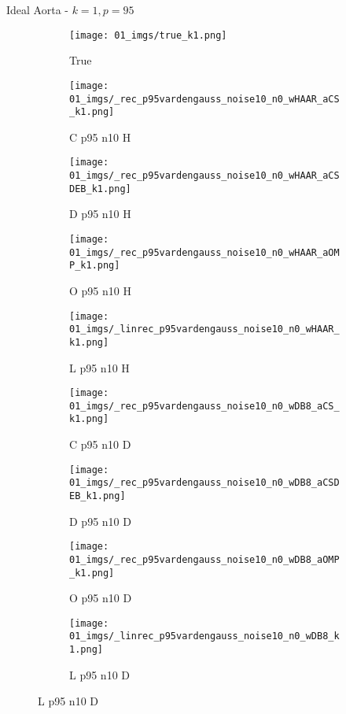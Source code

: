 \begin{frame}{Ideal Aorta - $k=1,p=95$}{}
\begin{figure}
\begin{subfigure}{0.1\textwidth}
\texttt{[image: 01\_imgs/true\_k1.png]}
\caption*{\Tiny True}
\end{subfigure}
\begin{subfigure}{0.1\textwidth}
\texttt{[image: 01\_imgs/\_rec\_p95vardengauss\_noise10\_n0\_wHAAR\_aCS\_k1.png]}
\caption*{\Tiny C p95 n10 H}
\end{subfigure}
\begin{subfigure}{0.1\textwidth}
\texttt{[image: 01\_imgs/\_rec\_p95vardengauss\_noise10\_n0\_wHAAR\_aCSDEB\_k1.png]}
\caption*{\Tiny D p95 n10 H}
\end{subfigure}
\begin{subfigure}{0.1\textwidth}
\texttt{[image: 01\_imgs/\_rec\_p95vardengauss\_noise10\_n0\_wHAAR\_aOMP\_k1.png]}
\caption*{\Tiny O p95 n10 H}
\end{subfigure}
\begin{subfigure}{0.1\textwidth}
\texttt{[image: 01\_imgs/\_linrec\_p95vardengauss\_noise10\_n0\_wHAAR\_k1.png]}
\caption*{\Tiny L p95 n10 H}
\end{subfigure}
\begin{subfigure}{0.1\textwidth}
\texttt{[image: 01\_imgs/\_rec\_p95vardengauss\_noise10\_n0\_wDB8\_aCS\_k1.png]}
\caption*{\Tiny C p95 n10 D}
\end{subfigure}
\begin{subfigure}{0.1\textwidth}
\texttt{[image: 01\_imgs/\_rec\_p95vardengauss\_noise10\_n0\_wDB8\_aCSDEB\_k1.png]}
\caption*{\Tiny D p95 n10 D}
\end{subfigure}
\begin{subfigure}{0.1\textwidth}
\texttt{[image: 01\_imgs/\_rec\_p95vardengauss\_noise10\_n0\_wDB8\_aOMP\_k1.png]}
\caption*{\Tiny O p95 n10 D}
\end{subfigure}
\begin{subfigure}{0.1\textwidth}
\texttt{[image: 01\_imgs/\_linrec\_p95vardengauss\_noise10\_n0\_wDB8\_k1.png]}
\caption*{\Tiny L p95 n10 D}
\end{subfigure}

\vspace{5pt}


\end{figure}
\end{frame}
